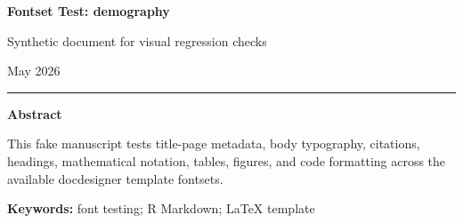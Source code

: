 \documentclass[12pt]{article}
\newif\ifdocdesigneranon
\begin{document}
\begin{titlepage}
\thispagestyle{empty}
\vspace*{0.12\textheight}
\begin{center}
\begin{singlespace}

{\LARGE\bfseries Fontset Test: demography\par}

\vspace{0.35em}
{\large Synthetic document for visual regression checks\par}

\vspace{2.2em}

\docdesignerauthorblock

\par\vspace{1.5\baselineskip}
\docdesignerseriesblock

\ifdocdesigneranon\else
\vspace{0.35em}
{\small May 2026}\par
\fi

\vspace{2.2\baselineskip}
\noindent\rule{0.35\textwidth}{0.4pt}\par
\vspace{0.65em}
\begin{minipage}{0.78\textwidth}
\small\singlespacing
\textbf{Abstract}\par\vspace{0.3em}
This fake manuscript tests title-page metadata, body typography,
citations, headings, mathematical notation, tables, figures, and code
formatting across the available docdesigner template fontsets.
\par\vspace{0.6em}
\textbf{Keywords:} font testing; R Markdown; LaTeX template
\end{minipage}

\end{singlespace}
\end{center}
\vfill
\end{titlepage}
\else
\end{document}
